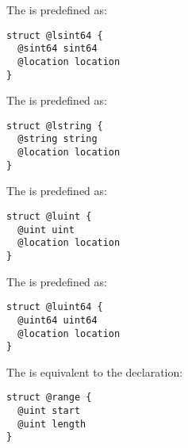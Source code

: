 
The  is predefined as:
\begin{lstlisting}[language=galgas]
struct @lsint64 {
  @sint64 sint64
  @location location
}
\end{lstlisting}








The  is predefined as:
\begin{lstlisting}[language=galgas]
struct @lstring {
  @string string
  @location location
}
\end{lstlisting}








The  is predefined as:
\begin{lstlisting}[language=galgas]
struct @luint {
  @uint uint
  @location location
}
\end{lstlisting}






The  is predefined as:
\begin{lstlisting}[language=galgas]
struct @luint64 {
  @uint64 uint64
  @location location
}
\end{lstlisting}



The  is equivalent to the declaration:
\begin{lstlisting}[language=galgas]
struct @range {
  @uint start
  @uint length
}
\end{lstlisting}


